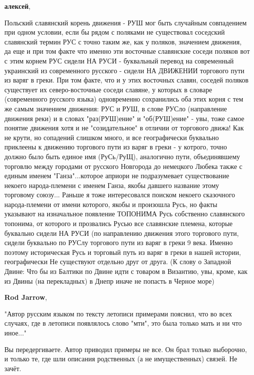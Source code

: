 \begin{itemize}
\begin{itemize}
\textbf{алексей}, 

Польский славянский корень движения - РУШ мог быть случайным совпадением при
одном условии, если бы рядом с поляками не существовал соседский славянский
термин РУС с точно таким же, как у поляков, значением движения, да еще и при
том факте что именно эти восточные славянские соседи поляков вот с этим корнем
РУС сидели НА РУСИ - буквальный перевод на современный украинский из
современного русского - сидели НА ДВИЖЕНИИ торгового пути из варяг в греки. При
том факте, что и у этих восточных славян, соседей поляков существует их
северо-восточные соседи славяне, у которых в словаре (современного русского
языка) одновременно сохранились оба этих корня с тем же самым значением
движения: РУС и РУШ, в слове РУСло (направление движения реки) и в словах
"раз(РУШ)ение" и "об(РУШ)ение" - увы, тоже самое понятие движения хотя и не
"созидательное" в отличии от торгового движа! Как не крути, но сопадений
слишком много, и все географически буквально приклеены к движению торгового
пути из варяг в греки - у котрого, точно должно было быть единое имя
(РуСь/РуЩ), аналогично пути, объединявшему торговлю между городами от русского
Новгорода до немецкого Любека также с единым именем "Ганза"...которое априори
не подразумевает существование некоего народа-племени с именем Ганза, якобы
давшего название этому торговому союзу... Раньше я тоже интересовался поиском
некоего сказочного народа-племени от имени которого, якобы и произошла Русь, но
факты указывают на изначальное появление ТОПОНИМА Русь собственно славянского
топонима, от которого и прозвались Русью все славянские племена, которые
буквально сидели НА РУСИ (по направлению движения этого торгового пути, сидели
буквально по РУСлу торгового пути из варяг в греки 9 века. Именно поэтому
историческая Русь и торговый путь из варяг в греки в нашей истории,
географически Не существуют отдельно друг от друга. (К слову о Западной Двине:
Что бы из Балтики по Двине идти с товаром в Византию, увы, кроме, как из Двины
(на перекладных) в Днепр иначе не попасть в Черное море)

\textbf{Rod Jarrow}, 

"Автор русским языком по тексту летописи примерами пояснил, что во всех
случаях, где в летописи появлялось слово "мти", это была только мать и ни что
иное..."

Вы передергиваете. Автор приводил примеры не все. Он брал только выборочно, и
только те, где шли описания родственных (а не имущественных) связей. Не зачёт.


\end{itemize}
\end{itemize}
